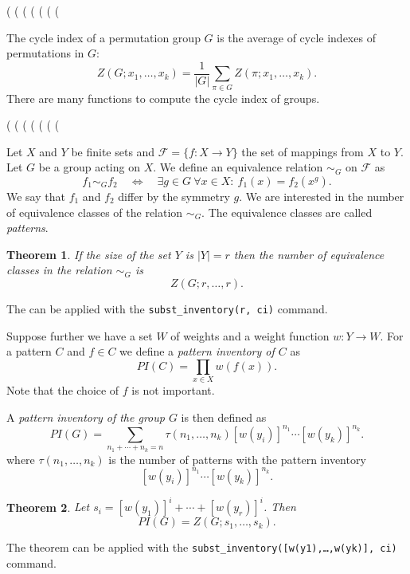 \documentclass[11pt]{article}
\newcommand{\command}[1]{\texttt{#1}}
\newcommand{\DEF}[1]{{\em #1}}
\newtheorem{theorem}{Theorem}
\begin{document}
\begin{example}
(%
(%
(%
(%
(%
(%
(%
\end{example} 
%
The cycle index of a permutation group $G$ is the average of cycle
indexes of permutations in $G$:
$$
Z(G;x_1,\ldots,x_k) = \frac{1}{|G|}\sum_{\pi\in G}Z(\pi; x_1,\ldots,x_k).
$$
There are many functions to compute the cycle index of groups.
\begin{example}
(%
(%
(%
(%
(%
(%
(%
\end{example}
%
Let $X$ and $Y$ be finite sets and $\mathcal{F}=\{f:X\to Y\}$ the set
of mappings from $X$ to $Y$. Let $G$ be a group acting on $X$. We
define an equivalence relation $\sim_G$ on $\mathcal{F}$ as
$$
f_1 \sim_G f_2 \quad \Longleftrightarrow \quad
\mbox{$\exists g\in G\ \forall x\in X: \ f_1(x)=f_2(x^g)$.}
$$
We say that $f_1$ and $f_2$ differ by the symmetry $g$. We are
interested in the number of equivalence classes of the relation
$\sim_G$. The equivalence classes are called \DEF{patterns}.

\begin{theorem}
\label{thm:polya1}
If the size of the set $Y$ is $|Y|=r$ then the number of equivalence
classes in the relation $\sim_G$ is
$$
Z(G; r,\ldots, r).
$$
\end{theorem}
The can be applied with the \command{subst\_inventory(r, ci)} command.

Suppose further we have a set $W$ of weights and a weight function
$w:Y\to W$. For a pattern $C$ and $f\in C$ we define a \DEF{pattern
  inventory of $C$} as
$$
PI(C) = \prod_{x\in X} w(f(x)).
$$
Note that the choice of $f$ is not important.

A \DEF{pattern inventory of the group $G$} is then defined as
$$
PI(G) = \sum_{n_1+\cdots+n_k=n}\tau(n_1,\ldots, n_k)[w(y_i)]^{n_1}\cdots [w(y_k)]^{n_k}.
$$
where $\tau(n_1,\ldots,n_k)$ is the number of patterns with the
pattern inventory
$$
[w(y_i)]^{n_1}\cdots [w(y_k)]^{n_k}.
$$

\begin{theorem}
\label{thm:polya2}
Let $s_i=[w(y_1)]^i+\cdots+[w(y_r)]^i$. Then
$$
PI(G) = Z(G; s_1,\ldots, s_k).
$$
\end{theorem}
The theorem can be applied with the
\command{subst\_inventory([w(y1),\ldots,w(yk)], ci)} command.
\end{document}
